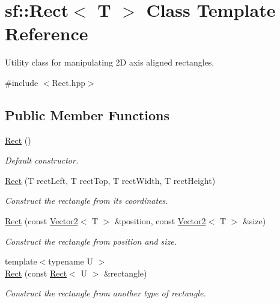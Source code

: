 \hypertarget{classsf_1_1_rect}{}\section{sf\+:\+:Rect$<$ T $>$ Class Template Reference}
\label{classsf_1_1_rect}


Utility class for manipulating 2D axis aligned rectangles.  




{\ttfamily \#include $<$Rect.\+hpp$>$}

\subsection*{Public Member Functions}
\begin{DoxyCompactItemize}
\item 
\mbox{\hyperlink{classsf_1_1_rect_a0f87ebaef9722a6222fd2e04ce8efb37}{Rect}} ()
\begin{DoxyCompactList}\small\item\em Default constructor. \end{DoxyCompactList}\item 
\mbox{\hyperlink{classsf_1_1_rect_a15cdbc5a1aed3a8fc7be1bd5004f19f9}{Rect}} (T rect\+Left, T rect\+Top, T rect\+Width, T rect\+Height)
\begin{DoxyCompactList}\small\item\em Construct the rectangle from its coordinates. \end{DoxyCompactList}\item 
\mbox{\hyperlink{classsf_1_1_rect_a27fdf85caa6d12caeeff78913cc59936}{Rect}} (const \mbox{\hyperlink{classsf_1_1_vector2}{Vector2}}$<$ T $>$ \&position, const \mbox{\hyperlink{classsf_1_1_vector2}{Vector2}}$<$ T $>$ \&size)
\begin{DoxyCompactList}\small\item\em Construct the rectangle from position and size. \end{DoxyCompactList}\item 
{\footnotesize template$<$typename U $>$ }\\\mbox{\hyperlink{classsf_1_1_rect_a6fff2bb7e93677839461a66bc2957de0}{Rect}} (const \mbox{\hyperlink{classsf_1_1_rect}{Rect}}$<$ U $>$ \&rectangle)
\begin{DoxyCompactList}\small\item\em Construct the rectangle from another type of rectangle. \end{DoxyCompactList}\item 

\end{DoxyCompactItemize}
